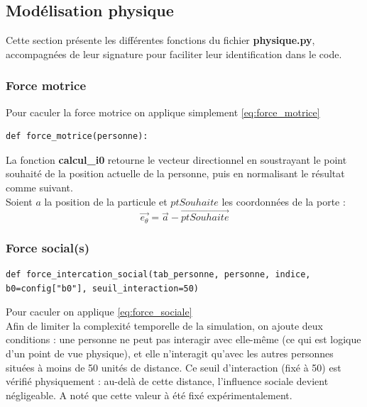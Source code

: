 \documentclass[a4paper,12pt]{article}
\begin{document}
\subsection{Modélisation physique}
Cette section présente les différentes fonctions du fichier \textbf{physique.py}, accompagnées de leur signature pour faciliter leur identification dans le code.
\subsubsection{Force motrice}

Pour caculer la force motrice on applique simplement \eqref{eq:force_motrice}

\begin{verbatim}
def force_motrice(personne):
\end{verbatim}

La fonction \textbf{calcul\_i0} retourne le vecteur directionnel en soustrayant le point souhaité de la position actuelle de la personne, puis en normalisant le résultat comme suivant.
\\
\indent Soient $a$ la position de la particule et $ptSouhaite$ les coordonnées de la porte :
\begin{equation}
	\vec{e_\theta} = \vec{a} - \vec{ptSouhaite}
\end{equation}


\subsubsection{Force social(s)}


\begin{verbatim}
def force_intercation_social(tab_personne, personne, indice, b0=config["b0"], seuil_interaction=50)
\end{verbatim}

Pour caculer on applique \eqref{eq:force_sociale}
\\

Afin de limiter la complexité temporelle de la simulation, on ajoute deux conditions : une personne ne peut pas interagir avec elle-même (ce qui est logique d’un point de vue physique), et elle n’interagit qu’avec les autres personnes situées à moins de 50 unités de distance.  Ce seuil d’interaction (fixé à 50) est vérifié physiquement : au-delà de cette distance, l’influence sociale devient négligeable. A noté que cette valeur à été fixé expérimentalement.
\end{document}
